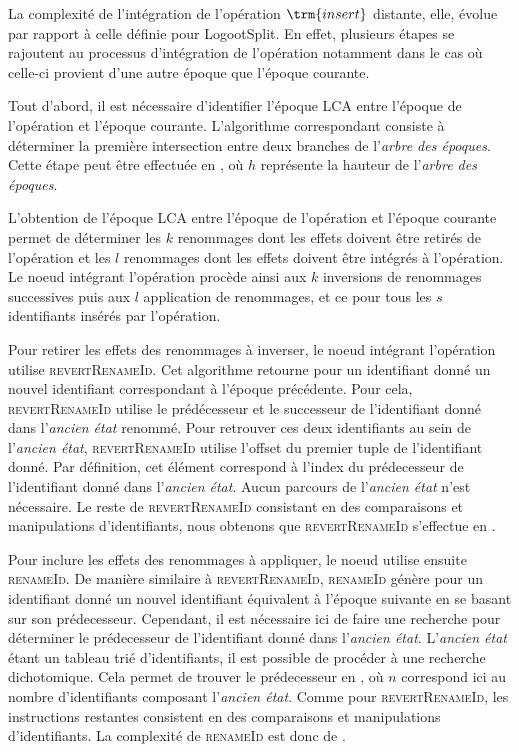 La complexité de l'intégration de l'opération $\trm{insert}$ distante, elle, évolue par rapport à celle définie pour LogootSplit.
En effet, plusieurs étapes se rajoutent au processus d'intégration de l'opération notamment dans le cas où celle-ci provient d'une autre époque que l'époque courante.

Tout d'abord, il est nécessaire d'identifier l'époque \ac{LCA} entre l'époque de l'opération et l'époque courante.
L'algorithme correspondant consiste à déterminer la première intersection entre deux branches de l'\emph{arbre des époques}.
Cette étape peut être effectuée en , où $h$ représente la hauteur de l'\emph{arbre des époques}.

L'obtention de l'époque \ac{LCA} entre l'époque de l'opération et l'époque courante permet de déterminer les $k$ renommages dont les effets doivent être retirés de l'opération et les $l$ renommages dont les effets doivent être intégrés à l'opération.
Le noeud intégrant l'opération procède ainsi aux $k$ inversions de renommages successives puis aux $l$ application de renommages, et ce pour tous les $s$ identifiants insérés par l'opération.

Pour retirer les effets des renommages à inverser, le noeud intégrant l'opération utilise \textsc{revertRenameId}.
Cet algorithme retourne pour un identifiant donné un nouvel identifiant correspondant à l'époque précédente.
Pour cela, \textsc{revertRenameId} utilise le prédécesseur et le successeur de l'identifiant donné dans l'\emph{ancien état} renommé.
Pour retrouver ces deux identifiants au sein de l'\emph{ancien état}, \textsc{revertRenameId} utilise l'offset du premier tuple de l'identifiant donné.
Par définition, cet élément correspond à l'index du prédecesseur de l'identifiant donné dans l'\emph{ancien état}.
Aucun parcours de l'\emph{ancien état} n'est nécessaire.
Le reste de \textsc{revertRenameId} consistant en des comparaisons et manipulations d'identifiants, nous obtenons que \textsc{revertRenameId} s'effectue en .

Pour inclure les effets des renommages à appliquer, le noeud utilise ensuite \textsc{renameId}.
De manière similaire à \textsc{revertRenameId}, \textsc{renameId} génère pour un identifiant donné un nouvel identifiant équivalent à l'époque suivante en se basant sur son prédecesseur.
Cependant, il est nécessaire ici de faire une recherche pour déterminer le prédecesseur de l'identifiant donné dans l'\emph{ancien état}.
L'\emph{ancien état} étant un tableau trié d'identifiants, il est possible de procéder à une recherche dichotomique.
Cela permet de trouver le prédecesseur en , où $n$ correspond ici au nombre d'identifiants composant l'\emph{ancien état}.
Comme pour \textsc{revertRenameId}, les instructions restantes consistent en des comparaisons et manipulations d'identifiants.
La complexité de \textsc{renameId} est donc de .

